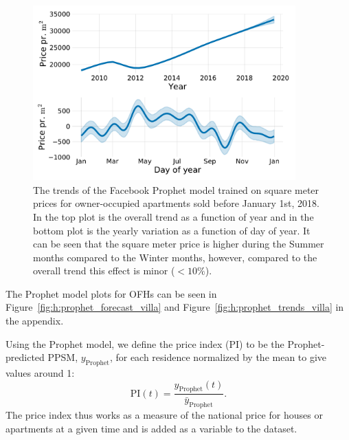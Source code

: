 \documentclass[a4paper, twoside, nobib]{tufte-book}
\newcommand{\code}[1]{\colorbox{light-gray}{\texttt{\detokenize{#1}}}}
\begin{document}
\begin{figure}
  \includegraphics[draft, width=0.9\textwidth, trim=15 15 15 15, clip]{figures/housing/Ejerlejlighed_v18_cut_all_Ncols_all_prophet_trends.pdf}
  \caption[Prophet Trends]
          {The trends of the Facebook Prophet model trained on square meter prices for owner-occupied apartments sold before January 1st, 2018. In the top plot is the overall trend as a function of year and in the bottom plot is the yearly variation as a function of day of year. It can be seen that the square meter price is higher during the Summer months compared to the Winter months, however, compared to the overall trend this effect is minor ($<10\%$). 
          }
  \label{fig:h:prophet_trends}
\end{figure}

The Prophet model plots for OFHs can be seen in Figure~\ref{fig:h:prophet_forecast_villa} and Figure~\ref{fig:h:prophet_trends_villa} in the appendix. 

Using the Prophet model, we define the price index (PI) to be the Prophet-predicted PPSM, $y_\mathrm{Prophet}$, for each residence normalized by the mean to give values around 1:
\begin{equation}
  \mathrm{PI}(t) = \frac{y_\mathrm{Prophet}(t)}{\bar{y}_\mathrm{Prophet}}.
\end{equation}
The price index thus works as a measure of the national price for houses or apartments at a given time and is added as a variable to the dataset. 

\end{document}
